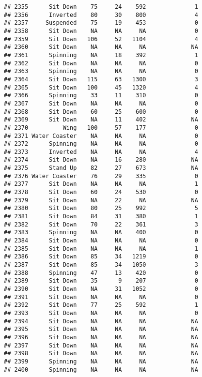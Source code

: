 \documentclass[
]{article}
\begin{document}
\begin{verbatim}
## 2355      Sit Down    75     24    592              1
## 2356      Inverted    80     30    800              4
## 2357     Suspended    75     19    453              0
## 2358      Sit Down    NA     NA     NA              0
## 2359      Sit Down   106     52   1104              4
## 2360      Sit Down    NA     NA     NA             NA
## 2361      Spinning    NA     18    392              1
## 2362      Sit Down    NA     NA     NA              0
## 2363      Spinning    NA     NA     NA              0
## 2364      Sit Down   115     63   1300              3
## 2365      Sit Down   100     45   1320              4
## 2366      Spinning    33     11    310              0
## 2367      Sit Down    NA     NA     NA              0
## 2368      Sit Down    60     25    600              0
## 2369      Sit Down    NA     11    402             NA
## 2370          Wing   100     57    177              0
## 2371 Water Coaster    NA     NA     NA              0
## 2372      Spinning    NA     NA     NA              0
## 2373      Inverted    NA     NA     NA              4
## 2374      Sit Down    NA     16    280             NA
## 2375      Stand Up    82     27    673             NA
## 2376 Water Coaster    76     29    335              0
## 2377      Sit Down    NA     NA     NA              1
## 2378      Sit Down    60     24    530              0
## 2379      Sit Down    NA     22     NA             NA
## 2380      Sit Down    80     25    992              5
## 2381      Sit Down    84     31    380              1
## 2382      Sit Down    70     22    361              3
## 2383      Spinning    NA     NA    400              0
## 2384      Sit Down    NA     NA     NA              0
## 2385      Sit Down    NA     NA     NA              1
## 2386      Sit Down    85     34   1219              0
## 2387      Sit Down    85     34   1050              3
## 2388      Spinning    47     13    420              0
## 2389      Sit Down    35      9    207              0
## 2390      Sit Down    NA     31   1052              0
## 2391      Sit Down    NA     NA     NA              0
## 2392      Sit Down    77     25    592              1
## 2393      Sit Down    NA     NA     NA              0
## 2394      Sit Down    NA     NA     NA             NA
## 2395      Sit Down    NA     NA     NA             NA
## 2396      Sit Down    NA     NA     NA             NA
## 2397      Sit Down    NA     NA     NA             NA
## 2398      Sit Down    NA     NA     NA             NA
## 2399      Spinning    NA     NA     NA             NA
## 2400      Spinning    NA     NA     NA             NA

\end{verbatim}
\end{document}
